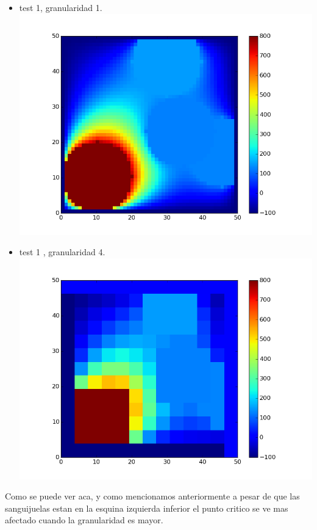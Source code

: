 \begin{itemize}
 \item test 1, granularidad 1.\\
  \includegraphics[width=400pt]{imagenes/testpropios/test11.png}

 \item test 1 , granularidad 4.\\
  \includegraphics[width=400pt]{imagenes/testpropios/test14.png}
\end{itemize}

Como se puede ver aca, y como mencionamos anteriormente a pesar de que las sanguijuelas estan en la esquina izquierda inferior el punto critico se ve mas afectado cuando la granularidad es mayor.

